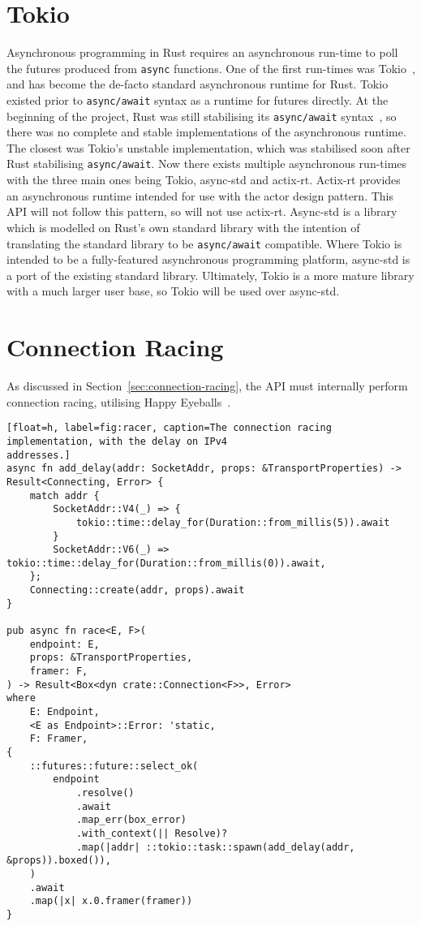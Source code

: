 \newcommand{\asyncawait}{\texttt{async/await}}

\section{Tokio}\label{sec:tokio}
Asynchronous programming in Rust requires an asynchronous run-time to poll the futures produced from \texttt{async}
functions.
One of the first run-times was Tokio~\citep{tokiocommunity_tokioasynchronousruntime_}, and has become the de-facto standard
asynchronous runtime for Rust.
Tokio existed prior to \asyncawait{} syntax as a runtime for futures directly.
At the beginning of the project, Rust was still stabilising its \asyncawait{} syntax~\citep{withoutboats_asyncawaitnotation_},
so there was no
complete and stable implementations of the asynchronous runtime.
The closest was Tokio's unstable implementation, which was stabilised soon after Rust stabilising
\asyncawait{}.
Now there exists multiple asynchronous run-times with the three main ones being Tokio, async-std and actix-rt.
Actix-rt provides an asynchronous runtime intended for use with the actor design pattern.
This API will not follow this pattern, so will not use actix-rt.
Async-std is a library which is modelled on Rust's own standard library with the intention of translating the standard
library to be \asyncawait{} compatible.
Where Tokio is intended to be a fully-featured asynchronous programming platform, async-std is a port of the existing
standard library.
Ultimately, Tokio is a more mature library with a much larger user base, so Tokio will be used over async-std.

\section{Connection Racing}\label{sec:connection-racing-impl}
As discussed in Section~\ref{sec:connection-racing}, the API must internally perform connection racing, utilising
Happy Eyeballs~\citep{pauly_happyeyeballsversion_}.

\begin{lstlisting}[float=h, label=fig:racer, caption=The connection racing implementation, with the delay on IPv4
addresses.]
async fn add_delay(addr: SocketAddr, props: &TransportProperties) -> Result<Connecting, Error> {
    match addr {
        SocketAddr::V4(_) => {
            tokio::time::delay_for(Duration::from_millis(5)).await
        }
        SocketAddr::V6(_) => tokio::time::delay_for(Duration::from_millis(0)).await,
    };
    Connecting::create(addr, props).await
}

pub async fn race<E, F>(
    endpoint: E,
    props: &TransportProperties,
    framer: F,
) -> Result<Box<dyn crate::Connection<F>>, Error>
where
    E: Endpoint,
    <E as Endpoint>::Error: 'static,
    F: Framer,
{
    ::futures::future::select_ok(
        endpoint
            .resolve()
            .await
            .map_err(box_error)
            .with_context(|| Resolve)?
            .map(|addr| ::tokio::task::spawn(add_delay(addr, &props)).boxed()),
    )
    .await
    .map(|x| x.0.framer(framer))
}
\end{lstlisting}

